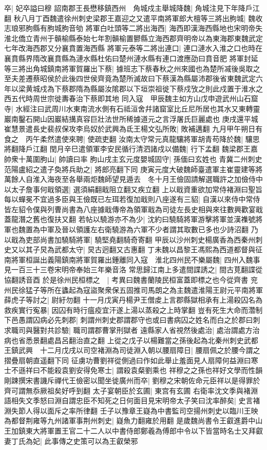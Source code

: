 卒|{
	妃卒謚曰穆}
詔南郡王長懋移鎮西州　角城戍主舉城降魏|{
	角城注見下年降戶江翻}
秋八月丁酉魏遣徐州刺史梁郡王嘉迎之又遣平南將軍郎大檀等三將出胊城|{
	魏收志琅邪朐縣有胊城胊音劬}
將軍白吐頭等二將出海西|{
	海西即漢海西縣地也宋明帝失淮北僑立青州于贑榆縣泰始七年割贑榆置鬰縣立海西郡齊明帝以為東海郡東魏武定七年改海西郡又分襄賁置海西縣}
將軍元泰等二將出連口|{
	連口漣水入淮之口也時在襄賁縣界隋改襄賁縣為漣水縣杜佑曰楚州漣水縣有連口渡應劭曰賁音肥}
將軍封延等三將出角城鎮南將軍賀羅出下蔡|{
	據班志下蔡春秋之州來國也為楚所㓕後吳取之至夫差遷蔡昭侯於此後四世侯齊竟為楚所滅故曰下蔡漢為縣屬沛郡後省東魏武定六年以梁黄城戍為下蔡郡隋為縣屬汝隂郡以下垣崇祖徙下蔡戍攷之則此戍置于淮水之西五代時周世宗徙夀春治下蔡即其地}
同入寇　甲辰魏主如方山戊申遊武州山石窟寺|{
	水經注曰武周川水東南流水側有石祗洹舍幷諸窟室比丘尼所居也其水又東轉靈巖南鑿石開山因巖結搆真容巨壯法世所稀據道元之言浮屠氏巨麗處也}
庚戌還平城　崔慧景遣長史裴叔保攻李烏奴於武興為氐王楊文弘所敗|{
	敗補邁翻}
九月甲午朔日有食之　丙午柔然遣使來聘|{
	使疏吏翻}
汝南太守常元真龍驤將軍胡青苟降於魏|{
	驤思將翻降戶江翻}
閏月辛巳遣領軍李安民循行清泗諸戍以備魏|{
	行下孟翻}
魏梁郡王嘉帥衆十萬圍朐山|{
	帥讀曰率}
胊山戌主玄元度嬰城固守|{
	孫偭曰玄姓也}
青冀二州刺史范陽盧紹之遣子奐將兵助之|{
	將郎亮翻下同}
庚寅元度大破魏師臺遣軍主崔靈建等將萬餘人自淮入海夜至各舉兩炬魏師望見遁去　冬十月王儉固請解選職許之加儉侍中以太子詹事何戢領選|{
	選須絹翻戢阻立翻又疾立翻}
上以戢資重欲加常侍褚淵曰聖旨每以蟬冕不宜過多臣與王儉既已左珥若復加戢則八座遂有三貂|{
	自漢以來侍中常侍皆左貂令僕與列曹尚書為八座據戢傳帝為領軍戢為司徒左長史相與來往數興歡宴戢蓋龍潛之舊也復扶又翻}
若帖以驍游亦不為少|{
	沈約曰驍騎將軍游擊將軍並漢襍號將軍也魏置為中軍及晉以領護左右衛驍游為六軍不少者謂其取數已多也少詩沼翻}
乃以戢為吏部尚書加驍騎將軍|{
	驍堅堯翻騎奇寄翻}
甲辰以沙州刺史楊廣香為西秦州刺史又以其子炅為武都太守|{
	炅古迥翻又古惠翻}
丁未魏以昌黎王馮熙為西道都督與征南將軍桓誕出義陽鎮南將軍賀羅出鍾離同入寇　淮北四州民不樂屬魏|{
	四州入魏事見一百三十三卷宋明帝奉始三年樂音洛}
常思歸江南上多遣間諜誘之|{
	間古莧翻諜從協翻誘音酉}
於是徐州民桓標之　|{
	考異曰魏書蘭陵民桓富蓋即標之也今從齊書}
兖州民徐猛子等所在蠭起為寇盜聚衆保五固推司馬朗之為主魏遣淮陽王尉元平南將軍薛虎子等討之|{
	尉紆勿翻}
十一月戊寅丹楊尹王僧䖍上言郡縣獄相承有上湯殺囚名為救疾實行寃暴|{
	因囚有時行瘟疫宜汗遂上湯以蒸殺之上時掌翻}
豈有死生大命而濳制下邑愚謂囚病必先刺郡|{
	刺謂州刺史郡謂郡守也或曰書病囚之姓名而白之於郡曰刺}
求職司與醫對共診驗|{
	職司謂郡曹掌刑獄者}
遠縣家人省視然後處治|{
	處治謂處方治病也省悉景翻處昌呂翻治直之翻}
上從之戊子以楊難當之孫後起為北秦州刺史武都王鎮武興　十二月戊戌以司空褚淵為司徒淵入朝以腰扇障日|{
	腰扇佩之於腰今謂之摺疊扇朝直遥翻下同}
征虜功曹劉祥從側過曰作如此舉止羞面見人扇障何益淵曰寒士不遜祥曰不能殺袁劉安得免寒士|{
	謂殺袁粲劉乘也}
祥穆之之孫也祥好文學而性韻剛踈撰宋書譏斥禪代王儉密以聞坐徙廣州而卒|{
	劉穆之宋朝佐命元臣祥以是得罪於齊可謂無忝厥祖矣好呼到翻}
太子宴朝臣於玄圃|{
	東宫有玄圃}
右衛率沈文季與褚淵語相失文季怒曰淵自謂忠臣不知死之日何面目見宋明帝太子笑曰沈率醉矣|{
	史言褚淵失節人得以面斥之率所律翻}
壬子以豫章王嶷為中書監司空揚州刺史以臨川王映為都督荆雍等九州諸軍事荆州刺史|{
	嶷魚力翻雍於用翻}
是歲魏尚書令王叡進爵中山王加鎮東大將軍置王官二十二人以中書侍郎鄭羲為傅郎中令以下皆當時名士又拜叡妻丁氏為妃|{
	此事傳之史策可以為王叡榮邪}


